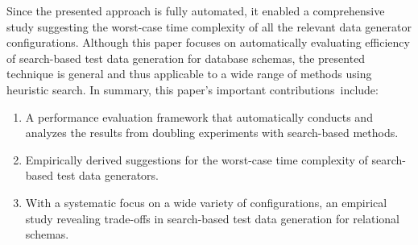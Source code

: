 Since the presented approach is fully automated, it enabled a comprehensive study suggesting the worst-case time
complexity of all the relevant data generator configurations. Although this paper focuses on automatically evaluating
efficiency of search-based test data generation for database schemas, the presented technique is general and thus
applicable to a wide range of methods using heuristic search. In summary, this paper's important \mbox{contributions
include}:



\vspace*{-.05in}
\begin{enumerate}
  \itemsep0in

  \item A performance evaluation framework that automatically conducts and analyzes the results from doubling
    experiments with search-based methods.

  \item Empirically derived suggestions for the worst-case time complexity of search-based test data generators.

  \item With a systematic focus on a wide variety of configurations, an empirical study revealing trade-offs
    in search-based test data generation for relational schemas.

  \end{enumerate}
  \vspace*{-.15in}
